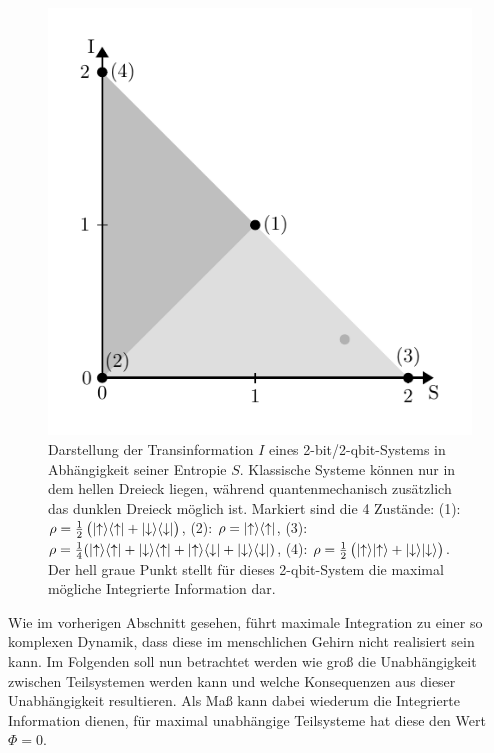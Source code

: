 
\begin{figure}
	\centering
	\includegraphics[scale=0.8]{graphics/presentation_qm_extra.pdf}
	\caption{Darstellung der Transinformation $I$ eines 2-bit/2-qbit-Systems in Abhängigkeit seiner
		Entropie $S$. Klassische Systeme können nur in dem hellen Dreieck liegen, während quantenmechanisch
		zusätzlich das dunklen Dreieck möglich ist. Markiert sind die 4 Zustände:
		(1): $\rho = \frac{1}{2} \del{\ketup\!\braup + \ketdown\!\bradown}$, (2): $\rho = \ket{\uparrow}\!\bra{\uparrow}$,
		(3): $\rho = \frac{1}{4} (\ket{\uparrow}\!\bra{\uparrow} + \ket{\downarrow}\!\bra{\uparrow}+ \ket{\uparrow}\!\bra{\downarrow} + \ket{\downarrow}\!\bra{\downarrow})$,
		(4): $\rho = \frac{1}{2} \del{\ketup\!\ketup + \ketdown\!\ketdown}$. Der hell graue Punkt stellt für dieses 
		2-qbit-System die maximal mögliche Integrierte Information dar. \label{fig:independence_plot}}
\end{figure}  

Wie im vorherigen Abschnitt gesehen, führt maximale Integration zu einer so komplexen Dynamik,
dass diese im menschlichen Gehirn nicht realisiert sein kann. Im Folgenden soll nun  
betrachtet werden wie groß die Unabhängigkeit zwischen Teilsystemen werden kann und welche Konsequenzen
aus dieser Unabhängigkeit resultieren. Als Maß kann dabei wiederum die Integrierte Information dienen, für maximal 
unabhängige Teilsysteme hat diese den Wert $\Phi = 0$.


